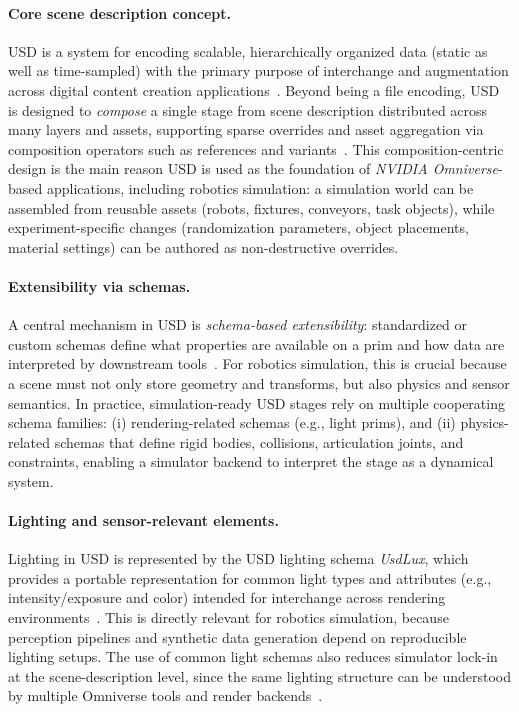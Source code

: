 \paragraph{Core scene description concept.}
\ac{USD} is a system for encoding scalable, hierarchically organized data (static as well as time-sampled) with the primary purpose of interchange and augmentation across digital content creation applications~\cite{openusd_usd_faq}. Beyond being a file encoding, \ac{USD} is designed to \emph{compose} a single stage from scene description distributed across many layers and assets, supporting sparse overrides and asset aggregation via composition operators such as references and variants~\cite{openusd_usd_faq}. This composition-centric design is the main reason \ac{USD} is used as the foundation of \emph{NVIDIA Omniverse}-based applications, including robotics simulation: a simulation world can be assembled from reusable assets (robots, fixtures, conveyors, task objects), while experiment-specific changes (randomization parameters, object placements, material settings) can be authored as non-destructive overrides.

\paragraph{Extensibility via schemas.}
A central mechanism in \ac{USD} is \emph{schema-based extensibility}: standardized or custom schemas define what properties are available on a prim and how data are interpreted by downstream tools~\cite{openusd_usd_faq,openusd_usdphysics_schema}. For robotics simulation, this is crucial because a scene must not only store geometry and transforms, but also physics and sensor semantics. In practice, simulation-ready \ac{USD} stages rely on multiple cooperating schema families:
(i) rendering-related schemas (e.g., light prims), and
(ii) physics-related schemas that define rigid bodies, collisions, articulation joints, and constraints, enabling a simulator backend to interpret the stage as a dynamical system.

\paragraph{Lighting and sensor-relevant elements.}
Lighting in \ac{USD} is represented by the \ac{USD} lighting schema \emph{UsdLux}, which provides a portable representation for common light types and attributes (e.g., intensity/exposure and color) intended for interchange across rendering environments~\cite{openusd_usdlux_schema}. This is directly relevant for robotics simulation, because perception pipelines and synthetic data generation depend on reproducible lighting setups. The use of common light schemas also reduces simulator lock-in at the scene-description level, since the same lighting structure can be understood by multiple Omniverse tools and render backends~\cite{openusd_usdlux_schema}.

